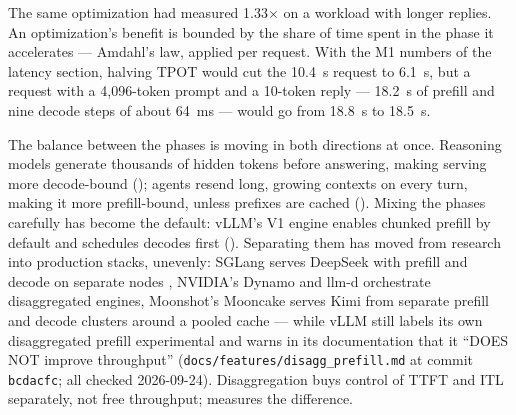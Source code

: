 The same optimization had measured 1.33$\times$ on a workload with longer
replies. An optimization's benefit is bounded by the share of time spent in
the phase it accelerates --- Amdahl's law, applied per request. With the M1
numbers of the latency section, halving TPOT would cut the 10.4~s request to
6.1~s, but a request with a 4,096-token prompt and a 10-token reply --- 18.2~s of
prefill and nine decode steps of about 64~ms --- would go from 18.8~s to
18.5~s.


The balance between the phases is moving in both directions at once.
Reasoning models generate thousands of hidden tokens before answering, making
serving more decode-bound (); agents resend long,
growing contexts on every turn, making it more prefill-bound, unless prefixes
are cached (). Mixing the phases carefully has become the
default: vLLM's V1 engine enables chunked prefill by default and schedules
decodes first \cite{vllm2026optimization} ().
Separating them has moved from research \cite{zhong2024distserve} into
production stacks, unevenly: SGLang serves DeepSeek with prefill and decode on
separate nodes \cite{sglang2025largeep}, NVIDIA's Dynamo \cite{nvidia2026dynamo}
and llm-d \cite{llmd2026} orchestrate disaggregated engines, Moonshot's
Mooncake serves Kimi from separate prefill and decode clusters around a pooled
cache \cite{qin2024mooncake} --- while vLLM still labels its own disaggregated
prefill experimental and warns in its documentation that it ``DOES NOT improve
throughput'' (\texttt{docs/features/disagg\_prefill.md} at commit
\texttt{bcdacfc}; all checked 2026-09-24). Disaggregation buys control of TTFT
and ITL separately, not free throughput;  measures
the difference.

\ExercisesSection

